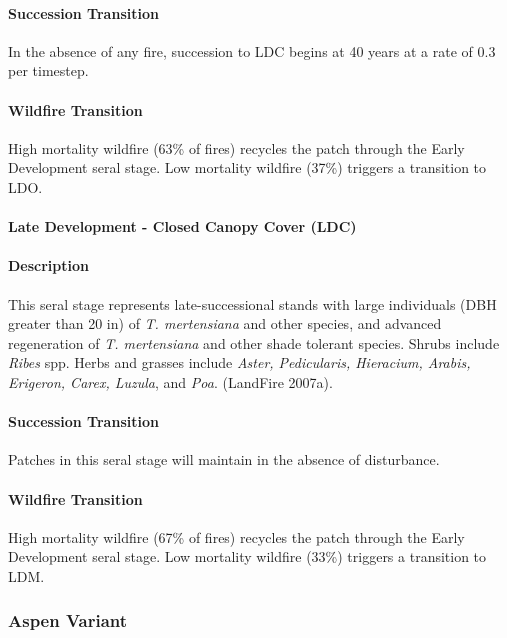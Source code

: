 \paragraph{Succession Transition} In the absence of any fire, succession to LDC begins at 40 years at a rate of 0.3 per timestep.

\paragraph{Wildfire Transition} High mortality wildfire (63\% of fires) recycles the patch through the Early Development seral stage. Low mortality wildfire (37\%) triggers a transition to LDO. 

\noindent\hrulefill

\paragraph{Late Development - Closed Canopy Cover (LDC)}

\paragraph{Description} This seral stage represents late-successional stands with large individuals (DBH greater than 20 in) of \emph{T. mertensiana} and other species, and advanced regeneration of \emph{T. mertensiana} and other shade tolerant species. Shrubs include \emph{Ribes} spp. Herbs and grasses include \emph{Aster, Pedicularis, Hieracium, Arabis, Erigeron, Carex, Luzula}, and \emph{Poa}. (LandFire 2007a).

\paragraph{Succession Transition} Patches in this seral stage will maintain in the absence of disturbance.

\paragraph{Wildfire Transition} High mortality wildfire (67\% of fires) recycles the patch through the Early Development seral stage. Low mortality wildfire (33\%) triggers a transition to LDM. 

\noindent\hrulefill
\noindent\hrulefill

\subsubsection{Aspen Variant}

